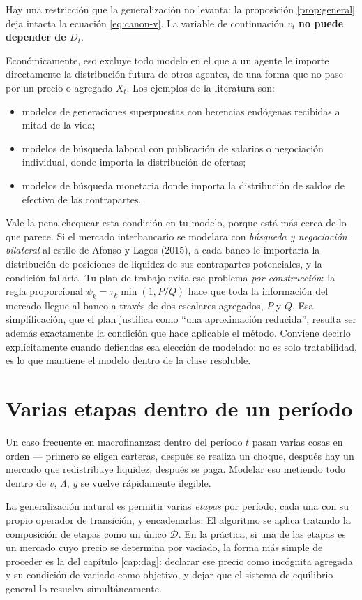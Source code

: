Hay una restricción que la generalización no levanta: la proposición
\ref{prop:general} deja intacta la ecuación \eqref{eq:canon-v}. La variable de
continuación $v_t$ \textbf{no puede depender de $D_t$}.

Económicamente, eso excluye todo modelo en el que a un agente le importe
directamente la distribución futura de otros agentes, de una forma que no pase
por un precio o agregado $X_t$. Los ejemplos de la literatura son:

\begin{itemize}[leftmargin=1.4em]
\item modelos de generaciones superpuestas con herencias endógenas recibidas a
mitad de la vida;
\item modelos de búsqueda laboral con publicación de salarios o negociación
individual, donde importa la distribución de ofertas;
\item modelos de búsqueda monetaria donde importa la distribución de saldos
de efectivo de las contrapartes.
\end{itemize}

\begin{tutesis}
Vale la pena chequear esta condición en tu modelo, porque está más cerca de lo
que parece. Si el mercado interbancario se modelara con \emph{búsqueda y
negociación bilateral} al estilo de Afonso y Lagos (2015), a cada banco le
importaría la distribución de posiciones de liquidez de sus contrapartes
potenciales, y la condición fallaría. Tu plan de trabajo evita ese problema
\emph{por construcción}: la regla proporcional $\psi_k = \tau_k \min(1, P/Q)$
hace que toda la información del mercado llegue al banco a través de dos
escalares agregados, $P$ y $Q$. Esa simplificación, que el plan justifica como
``una aproximación reducida'', resulta ser además exactamente la condición que
hace aplicable el método. Conviene decirlo explícitamente cuando defiendas esa
elección de modelado: no es solo tratabilidad, es lo que mantiene el modelo
dentro de la clase resoluble.
\end{tutesis}

\section{Varias etapas dentro de un período}

Un caso frecuente en macrofinanzas: dentro del período $t$ pasan varias cosas en
orden --- primero se eligen carteras, después se realiza un choque, después hay
un mercado que redistribuye liquidez, después se paga. Modelar eso metiendo
todo dentro de $v$, $\Lambda$, $y$ se vuelve rápidamente ilegible.

La generalización natural es permitir varias \emph{etapas} por período, cada una
con su propio operador de transición, y encadenarlas. El algoritmo se aplica
tratando la composición de etapas como un único $\mathcal{D}$. En la práctica, si
una de las etapas es un mercado cuyo precio se determina por vaciado, la forma
más simple de proceder es la del capítulo \ref{cap:dag}: declarar ese precio
como incógnita agregada y su condición de vaciado como objetivo, y dejar que el
sistema de equilibrio general lo resuelva simultáneamente.
